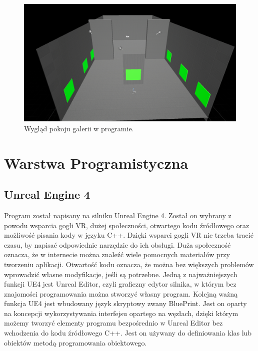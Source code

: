 \documentclass[a4paper,12pt,reqno]{article}
\begin{document}
\begin{figure}[!ht]%
\centering
\includegraphics[width=0.8\columnwidth]{graphics/Level.png}
\caption{Wygląd pokoju galerii w programie.
\label{OpenBrush}}%
%
\qquad
\end{figure}  

\newpage
\section{Warstwa Programistyczna}

\subsection{Unreal Engine 4}

Program został napisany na silniku Unreal Engine 4. Został on wybrany z powodu wsparcia gogli VR, dużej społeczności, otwartego kodu źródłowego oraz możliwość pisania kody w języku C++. Dzięki wsparci gogli VR nie trzeba tracić czasu, by napisać odpowiednie narzędzie do ich obsługi. Duża społeczność oznacza, że w internecie można znaleźć wiele pomocnych materiałów przy tworzeniu aplikacji. Otwartość kodu oznacza, że można bez większych problemów wprowadzić własne modyfikacje, jeśli są potrzebne. Jedną z najważniejszych funkcji UE4 jest Unreal Editor, czyli graficzny edytor silnika, w którym bez znajomości programowania można stworzyć własny program. Kolejną ważną funkcja UE4 jest wbudowany język skryptowy zwany BluePrint. Jest on oparty na koncepcji wykorzystywania interfejsu opartego na węzłach, dzięki którym możemy tworzyć elementy programu bezpośrednio w Unreal Editor bez wchodzenia do kodu źródłowego C++. Jest on używany do definiowania klas lub obiektów metodą programowania obiektowego.
\end{document}
